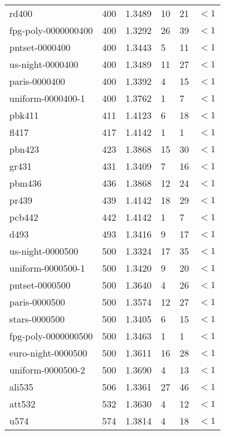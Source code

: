 \begin{longtable}{|lrrlll|}
rd400 & 400 & \num{1.3489} & \num{10} & \num{21} & $<1$ \\
fpg-poly-0000000400 & 400 & \num{1.3292} & \num{26} & \num{39} & $<1$ \\
pntset-0000400 & 400 & \num{1.3443} & \num{5} & \num{11} & $<1$ \\
us-night-0000400 & 400 & \num{1.3489} & \num{11} & \num{27} & $<1$ \\
paris-0000400 & 400 & \num{1.3392} & \num{4} & \num{15} & $<1$ \\
uniform-0000400-1 & 400 & \num{1.3762} & \num{1} & \num{7} & $<1$ \\
pbk411 & 411 & \num{1.4123} & \num{6} & \num{18} & $<1$ \\
fl417 & 417 & \num{1.4142} & \num{1} & \num{1} & $<1$ \\
pbn423 & 423 & \num{1.3868} & \num{15} & \num{30} & $<1$ \\
gr431 & 431 & \num{1.3409} & \num{7} & \num{16} & $<1$ \\
pbm436 & 436 & \num{1.3868} & \num{12} & \num{24} & $<1$ \\
pr439 & 439 & \num{1.4142} & \num{18} & \num{29} & $<1$ \\
pcb442 & 442 & \num{1.4142} & \num{1} & \num{7} & $<1$ \\
d493 & 493 & \num{1.3416} & \num{9} & \num{17} & $<1$ \\
us-night-0000500 & 500 & \num{1.3324} & \num{17} & \num{35} & $<1$ \\
uniform-0000500-1 & 500 & \num{1.3420} & \num{9} & \num{20} & $<1$ \\
pntset-0000500 & 500 & \num{1.3640} & \num{4} & \num{26} & $<1$ \\
paris-0000500 & 500 & \num{1.3574} & \num{12} & \num{27} & $<1$ \\
stars-0000500 & 500 & \num{1.3405} & \num{6} & \num{15} & $<1$ \\
fpg-poly-0000000500 & 500 & \num{1.3463} & \num{1} & \num{1} & $<1$ \\
euro-night-0000500 & 500 & \num{1.3611} & \num{16} & \num{28} & $<1$ \\
uniform-0000500-2 & 500 & \num{1.3690} & \num{4} & \num{13} & $<1$ \\
ali535 & 506 & \num{1.3361} & \num{27} & \num{46} & $<1$ \\
att532 & 532 & \num{1.3630} & \num{4} & \num{12} & $<1$ \\
u574 & 574 & \num{1.3814} & \num{4} & \num{18} & $<1$ \\

\end{longtable}
